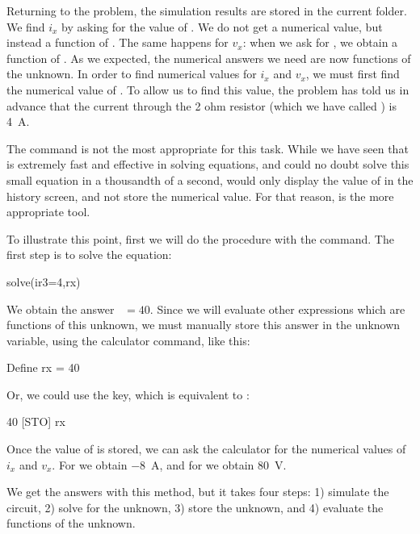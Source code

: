 Returning to the problem, the simulation results are stored in the
current folder. We find $i_x$ by asking for the value of .
We do not get a numerical value, but instead a function of
. The same happens for $v_x$: when we ask for ,
we obtain a function of . As we expected, the numerical
answers we need are now functions of the unknown. In order to find
numerical values for $i_x$ and $v_x$, we must first find the
numerical value of . To allow us to find this value, the
problem has told us in advance that the current through the 2 ohm
resistor (which we have called ) is 4~A.

The  command is not the most appropriate for this task.
While we have seen that  is extremely fast and effective
in solving equations, and could no doubt solve this small equation
in a thousandth of a second,  would only display the
value of  in the history screen, and not store the
numerical value. For that reason,  is the more
appropriate tool.

To illustrate this point, first we will do the procedure with the
 command. The first step is to solve the equation:

\begin{entry}
solve(ir3=4,rx)
\end{entry}

We obtain the answer ~$= 40$. Since we will evaluate other
expressions which are functions of this unknown, we must manually
store this answer in the unknown variable, using the calculator
 command, like this:

\begin{entry}
Define rx = 40
\end{entry}

Or, we could use the  key, which is equivalent to
:

\begin{entry}
40 [STO] rx
\end{entry}

Once the value of  is stored, we can ask the calculator for
the numerical values of $i_x$ and $v_x$. For  we obtain
$-8$~A, and for  we obtain 80~V.

We get the answers with this method, but it takes four steps: 1)
simulate the circuit, 2) solve for the unknown, 3) store the
unknown, and 4) evaluate the functions of the unknown.

